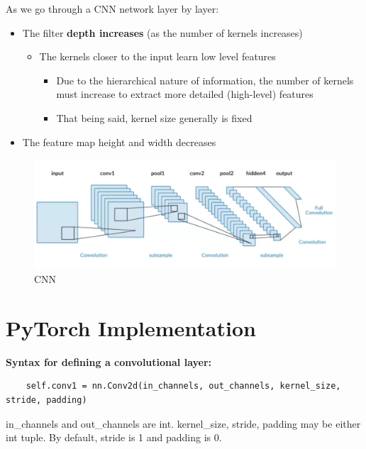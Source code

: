 \begin{idea}
    As we go through a CNN network layer by layer:
    \begin{itemize}
        \item The filter\textbf{ depth increases} (as the number of kernels increases)
        \begin{itemize}
            \item The kernels closer to the input learn low level features
            \begin{itemize}
                \item Due to the hierarchical nature of information, the number of kernels must increase to extract more detailed (high-level) features
                \item That being said, kernel size generally is fixed
            \end{itemize}
        \end{itemize}
        \item The feature map height and width decreases
    \end{itemize}
\end{idea}

\begin{figure}[h!t]
    \centering
    \includegraphics[width=0.75\linewidth]{cnn.png}
    \caption{CNN}
    \label{fig:enter-label}
\end{figure}

\section{PyTorch Implementation}

\begin{example}
  \textbf{  Syntax for defining a convolutional layer:}

\begin{verbatim}
    self.conv1 = nn.Conv2d(in_channels, out_channels, kernel_size, stride, padding)
\end{verbatim}
in\_channels and out\_channels are int. kernel\_size, stride, padding may be either int tuple. By default, stride is 1 and padding is 0.

\end{example}

